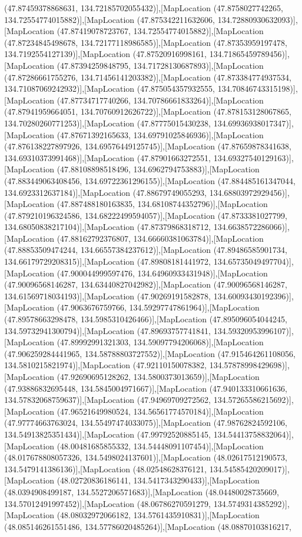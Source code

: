 (47.87459378868631, 134.72185702055432)],[MapLocation (47.8758027742265, 134.72554774015882)],[MapLocation (47.875342211632606, 134.72880930632093)],[MapLocation (47.87419078723767, 134.72554774015882)],[MapLocation (47.87234845498678, 134.72177118986585)],[MapLocation (47.87353959197478, 134.7192554127139)],[MapLocation (47.87520916998161, 134.71865459789456)],[MapLocation (47.87394259848795, 134.71728130687893)],[MapLocation (47.87286661755276, 134.71456141203382)],[MapLocation (47.873384774937534, 134.71087069242932)],[MapLocation (47.875054357932555, 134.70846743315198)],[MapLocation (47.87734717740266, 134.70786661833264)],[MapLocation (47.87941959664051, 134.70760912626722)],[MapLocation (47.878153128067865, 134.70280260771253)],[MapLocation (47.87775015430238, 134.69936938017347)],[MapLocation (47.87671392165633, 134.69791025846936)],[MapLocation (47.876138227897926, 134.69576449125745)],[MapLocation (47.87659878341638, 134.69310373991468)],[MapLocation (47.87901663272551, 134.69327540129163)],[MapLocation (47.88108898518496, 134.6962794753883)],[MapLocation (47.883449063408456, 134.69722361296155)],[MapLocation (47.884485161347044, 134.6923312637184)],[MapLocation (47.88679749055293, 134.68803972929456)],[MapLocation (47.887488180163835, 134.68108744352796)],[MapLocation (47.879210196324586, 134.68222499594057)],[MapLocation (47.8733381027799, 134.68050838217104)],[MapLocation (47.87379868318712, 134.6638572286066)],[MapLocation (47.88162792376807, 134.66660381063784)],[MapLocation (47.88853509474244, 134.66557384237612)],[MapLocation (47.89486585901734, 134.66179729208315)],[MapLocation (47.89808181441972, 134.65735049497704)],[MapLocation (47.900044999597476, 134.64960933431948)],[MapLocation (47.90096568146287, 134.63440827042982)],[MapLocation (47.90096568146287, 134.61569718034193)],[MapLocation (47.90269191582878, 134.60093430192396)],[MapLocation (47.9063676759766, 134.59297747861964)],[MapLocation (47.89578663298478, 134.5985310426466)],[MapLocation (47.895096054044245, 134.59732941300794)],[MapLocation (47.89693757741841, 134.59320953996107)],[MapLocation (47.89992991321303, 134.59097794206068)],[MapLocation (47.906259284441965, 134.58788803727552)],[MapLocation (47.915464261108056, 134.5810215821974)],[MapLocation (47.92110150078382, 134.57878998429698)],[MapLocation (47.92690695128262, 134.5800373013659)],[MapLocation (47.93886832695448, 134.5845004971667)],[MapLocation (47.940133310661636, 134.57832068759637)],[MapLocation (47.94969709272562, 134.57265586215692)],[MapLocation (47.96521649980524, 134.56561774570184)],[MapLocation (47.97774663763024, 134.55497474033075)],[MapLocation (47.98762824592106, 134.54913825351434)],[MapLocation (47.99792520885145, 134.54413758832064)],[MapLocation (48.00481685855332, 134.54448091107454)],[MapLocation (48.017678808057326, 134.5498024137601)],[MapLocation (48.02617512190573, 134.5479141386136)],[MapLocation (48.02548628376121, 134.54585420209017)],[MapLocation (48.02720836186141, 134.5417343290433)],[MapLocation (48.0394908499187, 134.5527206571683)],[MapLocation (48.04480028735669, 134.57012491997452)],[MapLocation (48.06786270591279, 134.5749314385292)],[MapLocation (48.08032972066182, 134.5761435910831)],[MapLocation (48.085146261551486, 134.57786020485264)],[MapLocation (48.08870103816217, 